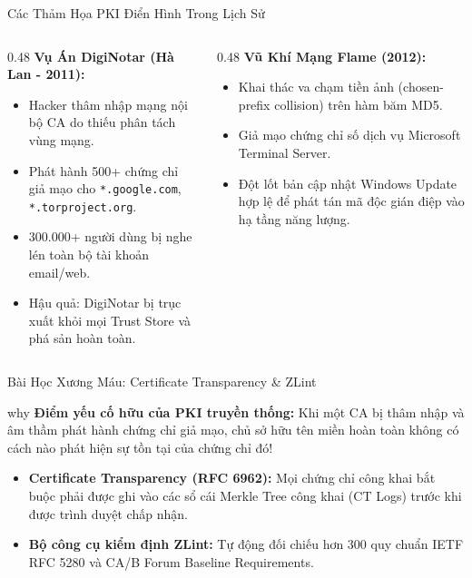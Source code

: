 \begin{frame}{Các Thảm Họa PKI Điển Hình Trong Lịch Sử}
  \begin{columns}[T]
    \begin{column}{0.48\textwidth}
      \textbf{Vụ Án DigiNotar (Hà Lan - 2011):}
      \begin{itemize}\small
        \item Hacker thâm nhập mạng nội bộ CA do thiếu phân tách vùng mạng.
        \item Phát hành 500+ chứng chỉ giả mạo cho \texttt{*.google.com}, \texttt{*.torproject.org}.
        \item 300.000+ người dùng bị nghe lén toàn bộ tài khoản email/web.
        \item Hậu quả: DigiNotar bị trục xuất khỏi mọi Trust Store và phá sản hoàn toàn.
      \end{itemize}
    \end{column}
    \begin{column}{0.48\textwidth}
      \textbf{Vũ Khí Mạng Flame (2012):}
      \begin{itemize}\small
        \item Khai thác va chạm tiền ảnh (chosen-prefix collision) trên hàm băm MD5.
        \item Giả mạo chứng chỉ số dịch vụ Microsoft Terminal Server.
        \item Đột lốt bản cập nhật Windows Update hợp lệ để phát tán mã độc gián điệp vào hạ tầng năng lượng.
      \end{itemize}
    \end{column}
  \end{columns}
\end{frame}

\begin{frame}{Bài Học Xương Máu: Certificate Transparency \& ZLint}
  \begin{beyond}{why}
    \textbf{Điểm yếu cố hữu của PKI truyền thống:} Khi một CA bị thâm nhập và âm thầm phát hành chứng chỉ giả mạo, chủ sở hữu tên miền hoàn toàn không có cách nào phát hiện sự tồn tại của chứng chỉ đó!
  \end{beyond}

  \begin{keybox}
    \begin{itemize}\small
      \item \textbf{Certificate Transparency (RFC 6962):} Mọi chứng chỉ công khai bắt buộc phải được ghi vào các sổ cái Merkle Tree công khai (CT Logs) trước khi được trình duyệt chấp nhận.
      \item \textbf{Bộ công cụ kiểm định ZLint:} Tự động đối chiếu hơn 300 quy chuẩn IETF RFC 5280 và CA/B Forum Baseline Requirements.
    \end{itemize}
  \end{keybox}
\end{frame}

